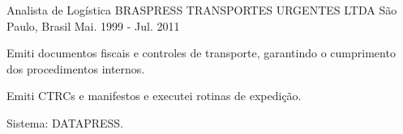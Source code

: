\begin{cventries}
  \cventry
    {Analista de Logística} %
    {BRASPRESS TRANSPORTES URGENTES LTDA} %
    {São Paulo, Brasil} %
    {Mai. 1999 - Jul. 2011} %
    {
      \begin{cvitems} %
        \item {Emiti documentos fiscais e controles de transporte, garantindo o cumprimento dos procedimentos internos.}
        \item {Emiti CTRCs e manifestos e executei rotinas de expedição.}
        \item {Sistema: DATAPRESS.}
      \end{cvitems}
    }


\end{cventries}
